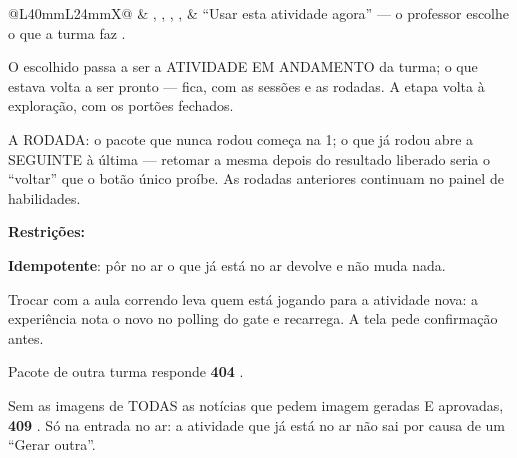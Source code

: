 \begin{tabularx}{\linewidth}{@{}L{40mm}L{24mm}X@{}}
\zebra {} & , , , ,  & \enquote{Usar esta atividade agora} --- o professor escolhe o que a turma faz .\par O escolhido passa a ser a ATIVIDADE EM ANDAMENTO da turma; o que estava volta a ser pronto --- fica, com as sessões e as rodadas. A etapa volta à exploração, com os portões fechados.\par A RODADA: o pacote que nunca rodou começa na 1; o que já rodou abre a SEGUINTE à última --- retomar a mesma depois do resultado liberado seria o \enquote{voltar} que o botão único proíbe. As rodadas anteriores continuam no painel de habilidades.\par \textbf{Restrições:}\par \hspace*{1em}\textbullet{} \textbf{Idempotente}: pôr no ar o que já está no ar devolve  e não muda nada.\par \hspace*{1em}\textbullet{} Trocar com a aula correndo leva quem está jogando para a atividade nova: a experiência nota o  novo no polling do gate e recarrega. A tela pede confirmação antes.\par \hspace*{1em}\textbullet{} Pacote de outra turma responde \textbf{404} .\par \hspace*{1em}\textbullet{} Sem as imagens de TODAS as notícias que pedem imagem geradas E aprovadas, \textbf{409}  . Só na entrada no ar: a atividade que já está no ar não sai por causa de um \enquote{Gerar outra}.\\

\end{tabularx}
